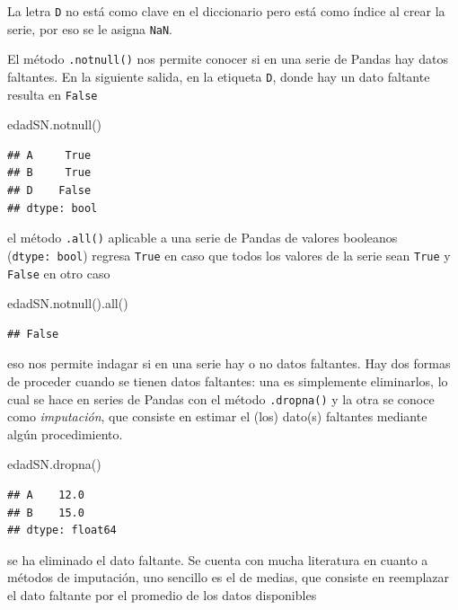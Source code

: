 \documentclass[
]{book}
\newenvironment{Shaded}{\begin{snugshade}}{\end{snugshade}}
\newcommand{\BuiltInTok}[1]{#1}
\newcommand{\NormalTok}[1]{#1}
\theoremstyle{definition}
\theoremstyle{definition}
\theoremstyle{definition}
\theoremstyle{definition}
\theoremstyle{remark}
\begin{document}
La letra \texttt{D} no está como clave en el diccionario pero está como índice al crear la serie, por eso se le asigna \texttt{NaN}.

El método \texttt{.notnull()} nos permite conocer si en una serie de Pandas hay datos faltantes. En la siguiente salida, en la etiqueta \texttt{D}, donde hay un dato faltante resulta en \texttt{False}

\begin{Shaded}
\begin{Highlighting}[]
\NormalTok{edadSN.notnull()}
\end{Highlighting}
\end{Shaded}

\begin{verbatim}
## A     True
## B     True
## D    False
## dtype: bool
\end{verbatim}

el método \texttt{.all()} aplicable a una serie de Pandas de valores booleanos (\texttt{dtype:\ bool}) regresa \texttt{True} en caso que todos los valores de la serie sean \texttt{True} y \texttt{False} en otro caso

\begin{Shaded}
\begin{Highlighting}[]
\NormalTok{edadSN.notnull().}\BuiltInTok{all}\NormalTok{()}
\end{Highlighting}
\end{Shaded}

\begin{verbatim}
## False
\end{verbatim}

eso nos permite indagar si en una serie hay o no datos faltantes. Hay dos formas de proceder cuando se tienen datos faltantes: una es simplemente eliminarlos, lo cual se hace en series de Pandas con el método \texttt{.dropna()} y la otra se conoce como \emph{imputación}, que consiste en estimar el (los) dato(s) faltantes mediante algún procedimiento.

\begin{Shaded}
\begin{Highlighting}[]
\NormalTok{edadSN.dropna()}
\end{Highlighting}
\end{Shaded}

\begin{verbatim}
## A    12.0
## B    15.0
## dtype: float64
\end{verbatim}

se ha eliminado el dato faltante. Se cuenta con mucha literatura en cuanto a métodos de imputación, uno sencillo es el de medias, que consiste en reemplazar el dato faltante por el promedio de los datos disponibles
\end{document}
